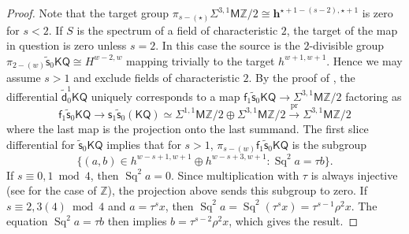 \documentclass[11pt,hyp,english]{article}
\newcommand{\Z}{\mathbb{Z}}
\newcommand{\KQ}{\mathsf{KQ}}
\newcommand{\MZ}{\mathsf{M}\Z}
\newcommand{\Sq}{\operatorname{Sq}}
\newcommand{\pr}{\operatorname{pr}}
\newcommand{\s}{\mathsf{s}}
\newcommand{\vs}{\tilde{\mathsf{s}}}
\newcommand{\f}{\mathsf{f}}
\newcommand{\vd}{{\tilde{\mathsf{d}}}}
\newcommand{\bideg}{(\star)}
\let\iso=\cong
\theoremstyle{definition}
\begin{document}
\begin{proof}
Note that the target group $\pi_{s-(\star)}\Sigma^{3,1}\MZ/2\cong \mathbf{h}^{\star+1-(s-2),\star+1}$ is zero for $s<2$. 
If $S$ is the spectrum of a field of characteristic $2$, the target of the map in question is zero unless $s=2$. 
In this case the source is the $2$-divisible group $\pi_{2-(w)}\vs_0\KQ\iso H^{w-2,w}$ mapping trivially to the target $h^{w+1,w+1}$.
Hence we may assume $s>1$ and exclude fields of characteristic $2$. 
By the proof of , the differential $\vd^1_0\KQ$ uniquely corresponds to a map $\f_1\vs_0\KQ\to \Sigma^{3,1}\MZ/2$ factoring as 
\[ \f_1\vs_0\KQ \to \s_1\vs_0(\KQ)\simeq \Sigma^{1,1}\MZ/2\oplus \Sigma^{3,1}\MZ/2 \xrightarrow{\pr} \Sigma^{3,1}\MZ/2\]
where the last map is the projection onto the last summand.
The first slice differential for $\vs_0\KQ$ implies that for $s>1$, $\pi_{s-(w)}\f_1\vs_0\KQ$ is the subgroup
\[ \bigl\lbrace (a,b)\in h^{w-s+1,w+1}\oplus h^{w-s+3,w+1}\colon \Sq^2a=\tau b\bigr\rbrace. \]
If $s\equiv 0,1 \bmod 4$, then $\Sq^2a=0$.
Since multiplication with $\tau$ is always injective (see  for the case of $\Z$), the projection above sends this subgroup to zero.
If $s\equiv 2,3(4) \bmod 4$ and $a=\tau^sx$, then $\Sq^2a=\Sq^2(\tau^sx)=\tau^{s-1}\rho^2x$.
The equation $\Sq^2a=\tau b$ then implies $b=\tau^{s-2}\rho^2x$, which gives the result.

\end{proof}
\end{document}
